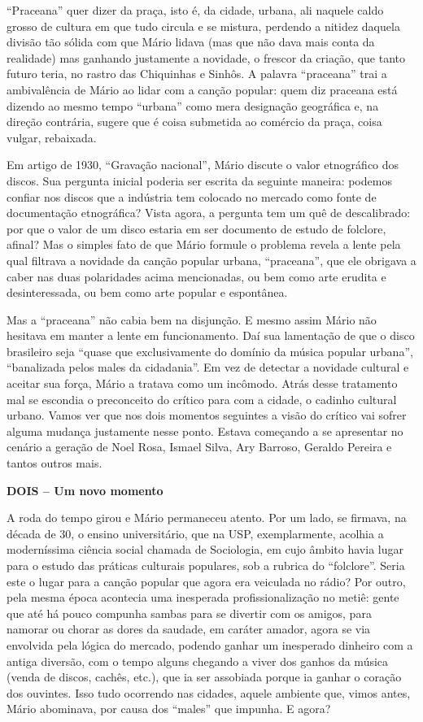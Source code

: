 ``Praceana'' quer dizer da praça, isto é, da cidade, urbana, ali naquele
caldo grosso de cultura em que tudo circula e se mistura, perdendo a
nitidez daquela divisão tão sólida com que Mário lidava (mas que não
dava mais conta da realidade) mas ganhando justamente a novidade, o
frescor da criação, que tanto futuro teria, no rastro das Chiquinhas e
Sinhôs. A palavra ``praceana'' trai a ambivalência de Mário ao lidar com
a canção popular: quem diz praceana está dizendo ao mesmo tempo
``urbana'' como mera designação geográfica e, na direção contrária,
sugere que é coisa submetida ao comércio da praça, coisa vulgar,
rebaixada.

Em artigo de 1930, ``Gravação nacional'', Mário discute o valor
etnográfico dos discos. Sua pergunta inicial poderia ser escrita da
seguinte maneira: podemos confiar nos discos que a indústria tem
colocado no mercado como fonte de documentação etnográfica? Vista agora,
a pergunta tem um quê de descalibrado: por que o valor de um disco
estaria em ser documento de estudo de folclore, afinal? Mas o simples
fato de que Mário formule o problema revela a lente pela qual filtrava a
novidade da canção popular urbana, ``praceana'', que ele obrigava a
caber nas duas polaridades acima mencionadas, ou bem como arte erudita e
desinteressada, ou bem como arte popular e espontânea.

Mas a ``praceana'' não cabia bem na disjunção. E mesmo assim Mário não
hesitava em manter a lente em funcionamento. Daí sua lamentação de que o
disco brasileiro seja ``quase que exclusivamente do domínio da música
popular urbana'', ``banalizada pelos males da cidadania''. Em vez de
detectar a novidade cultural e aceitar sua força, Mário a tratava como
um incômodo. Atrás desse tratamento mal se escondia o preconceito do
crítico para com a cidade, o cadinho cultural urbano. Vamos ver que nos
dois momentos seguintes a visão do crítico vai sofrer alguma mudança
justamente nesse ponto. Estava começando a se apresentar no cenário a
geração de Noel Rosa, Ismael Silva, Ary Barroso, Geraldo Pereira e
tantos outros mais.

\textbf{DOIS -- Um novo momento}

A roda do tempo girou e Mário permaneceu atento. Por um lado, se
firmava, na década de 30, o ensino universitário, que na USP,
exemplarmente, acolhia a moderníssima ciência social chamada de
Sociologia, em cujo âmbito havia lugar para o estudo das práticas
culturais populares, sob a rubrica do ``folclore''. Seria este o lugar
para a canção popular que agora era veiculada no rádio? Por outro, pela
mesma época acontecia uma inesperada profissionalização no metiê: gente
que até há pouco compunha sambas para se divertir com os amigos, para
namorar ou chorar as dores da saudade, em caráter amador, agora se via
envolvida pela lógica do mercado, podendo ganhar um inesperado dinheiro
com a antiga diversão, com o tempo alguns chegando a viver dos ganhos da
música (venda de discos, cachês, etc.), que ia ser assobiada porque ia
ganhar o coração dos ouvintes. Isso tudo ocorrendo nas cidades, aquele
ambiente que, vimos antes, Mário abominava, por causa dos ``males'' que
impunha. E agora?

